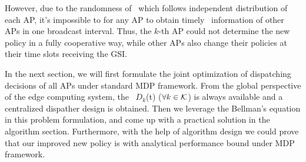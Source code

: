 However, due to the randomness of \brlatency~which follows independent distribution of each AP, it's impossible to for any AP to obtain timely \brlatency~information of other APs in one broadcast interval.
Thus, the $k$-th AP could not determine the new policy in a fully cooperative way, while other APs also change their policies at their time slots receiving the GSI.

In the next section, we will first formulate the joint optimization of dispatching decisions of all APs under standard MDP framework.
From the global perspective of the edge computing system, the \brlatency~$D_{k}$(t) ($\forall k\in\mathcal{K}$) is always available and a centralized dispather design is obtained.
Then we leverage the Bellman's equation in this problem formulation, and come up with a practical solution in the algorithm section. 
Furthermore, with the help of algorithm design we could prove that our improved new policy is with analytical performance bound under MDP framework.

